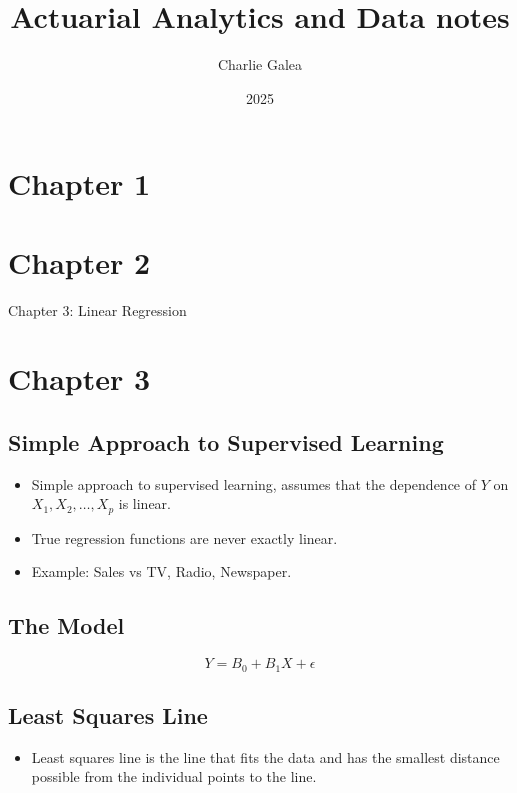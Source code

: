 \documentclass{article}
\begin{document}
\title{Actuarial Analytics and Data notes}
\author{Charlie Galea}
\date{2025}
\maketitle

\pagebreak
\tableofcontents
\pagebreak

\section{Chapter 1}

\section{Chapter 2}


\begin{center}
    \Large{Chapter 3: Linear Regression}
\end{center}

\section{Chapter 3}

\subsection{Simple Approach to Supervised Learning}
\begin{itemize}
    \item Simple approach to supervised learning, assumes that the dependence of $Y$ on $X_1, X_2, \dots, X_p$ is linear.
    \item True regression functions are never exactly linear.
    \item Example: Sales vs TV, Radio, Newspaper.
\end{itemize}

\subsection{The Model}
\[
Y = B_0 + B_1 X + \epsilon
\]

\subsection{Least Squares Line}
\begin{itemize}
    \item Least squares line is the line that fits the data and has the smallest distance possible from the individual points to the line.
\end{itemize}
\end{document}
